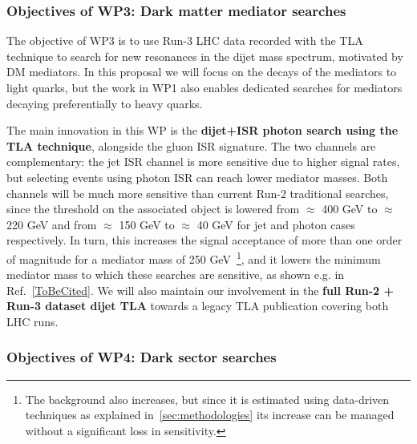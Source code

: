 \subsubsection{Objectives of WP3: Dark matter mediator searches}

The objective of WP3 is to use Run-3 LHC data recorded with the TLA technique to search for new resonances in the dijet mass spectrum, motivated by DM mediators.
In this proposal we will focus on the decays of the mediators to light quarks, but the work in WP1 also enables dedicated searches for mediators decaying preferentially to heavy quarks. 

The main innovation in this WP is the \textbf{dijet+ISR photon search using the TLA technique}, alongside the gluon ISR signature. 
The two channels are complementary: the jet ISR channel is more sensitive due to higher signal rates, but selecting events using photon ISR can reach lower mediator masses. 
Both channels will be much more sensitive than current Run-2 traditional searches, since the threshold on the associated object is lowered from $\approx$ 400 GeV to $\approx$ 220 GeV and from $\approx$ 150 GeV to $\approx$ 40 GeV for jet and photon cases respectively.  
In turn, this increases the signal acceptance of more than one order of magnitude for a mediator mass of 250 GeV~\footnote{The background also increases, but since it is estimated using data-driven techniques as explained in~\ref{sec:methodologies} its increase can be managed without a significant loss in sensitivity.}, 
and it lowers the minimum mediator mass to which these searches are sensitive, as shown e.g. in Ref.~\ref{ToBeCited}.%
We will also maintain our involvement in the \textbf{full Run-2 + Run-3 dataset dijet TLA} towards a legacy TLA publication covering both LHC runs.

\subsubsection{Objectives of WP4: Dark sector searches}

